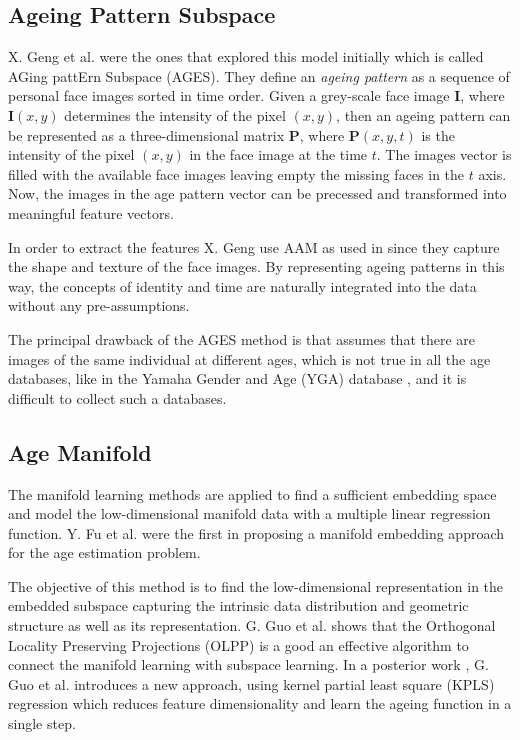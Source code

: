 \subsection{Ageing Pattern Subspace}

X. Geng et al. \cite{4359348, Geng:2006:LFA:1180639.1180711} were the ones that explored this model initially which is called AGing pattErn Subspace (AGES). They define an \textit{ageing pattern} as a sequence of personal face images sorted in time order. Given a grey-scale face image $\textbf{I}$, where $\textbf{I}(x,y)$ determines the intensity of the pixel $(x,y)$, then an ageing pattern can be represented as a three-dimensional matrix $\textbf{P}$, where $\textbf{P}(x,y,t)$ is the intensity of the pixel $(x,y)$ in the face image at the time $t$. The images vector is filled with the available face images leaving empty the missing faces in the $t$ axis. Now, the images in the age pattern vector can be precessed and transformed into meaningful feature vectors.

In order to extract the features X. Geng use AAM as used in \cite{791208} since they capture the shape and texture of the face images. By representing ageing patterns in this way, the concepts of identity and time are naturally integrated into the data without any pre-assumptions.

The principal drawback of the AGES method is that assumes that there are images of the same individual at different ages, which is not true in all the age databases, like in the Yamaha Gender and Age (YGA) database \cite{4523958}, and it is difficult to collect such a databases.

\subsection{Age Manifold}
 
The manifold learning methods are applied to find a sufficient embedding space and model the low-dimensional manifold data with a multiple linear regression function. Y. Fu et al. \cite{4523958, 4284917} were the first in proposing a manifold embedding approach for the age estimation problem. 

The objective of this method is to find the low-dimensional representation in the embedded subspace capturing the intrinsic data distribution and geometric structure as well as its representation. G. Guo et al. \cite{Guo:2008:IHA:2319085.2321608} \cite{4531189} shows that the Orthogonal Locality Preserving Projections (OLPP) \cite{CHHZ06}  is a good an effective algorithm  to connect the manifold learning with subspace learning. In a posterior work \cite{5995404}, G. Guo et al. introduces a new approach, using kernel partial least square (KPLS) regression which reduces feature dimensionality and learn the ageing function in a single step.

